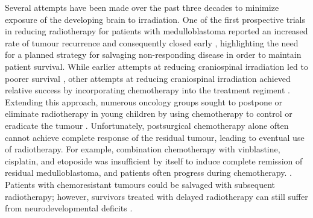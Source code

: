 Several attempts have been made over the past three decades to minimize exposure of the developing brain to irradiation. One of the first prospective trials in reducing radiotherapy for patients with medulloblastoma reported an increased rate of tumour recurrence and consequently closed early , highlighting the need for a planned strategy for salvaging non-responding disease in order to maintain patient survival. While earlier attempts at reducing craniospinal irradiation led to poorer survival , other attempts at reducing craniospinal irradiation achieved relative success by incorporating chemotherapy into the treatment regiment . Extending this approach, numerous oncology groups sought to postpone or eliminate radiotherapy in young children by using chemotherapy to control or eradicate the tumour . Unfortunately, postsurgical chemotherapy alone often cannot achieve complete response of the residual tumour, leading to eventual use of radiotherapy. For example, combination chemotherapy with vinblastine, cisplatin, and etoposide was insufficient by itself to induce complete remission of residual medulloblastoma, and patients often progress during chemotherapy. . Patients with chemoresistant tumours could be salvaged with subsequent radiotherapy; however, survivors treated with delayed radiotherapy can still suffer from neurodevelopmental deficits .

